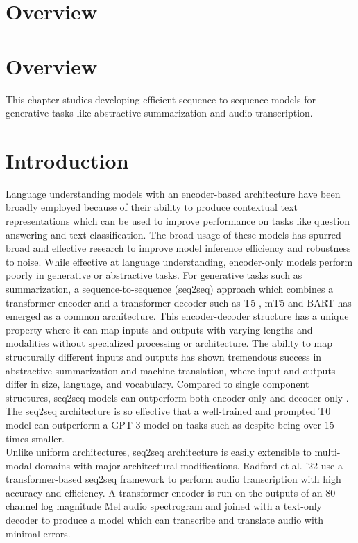 \section{Overview}
\section{Overview}
This chapter studies developing efficient sequence-to-sequence models for generative tasks like abstractive summarization and audio transcription. 
\section{Introduction}
Language understanding models with an encoder-based architecture have been broadly employed because of their ability to produce contextual text representations which can be used to improve performance on tasks like question answering and text classification. The broad usage of these models has spurred broad and effective research to improve model inference efficiency and robustness to noise. While effective at language understanding, encoder-only models perform poorly in generative or abstractive tasks. For generative tasks such as summarization, a sequence-to-sequence (seq2seq) approach which combines a transformer encoder and a transformer decoder such as T5 \cite{Raffel2020ExploringTL}, mT5 \cite{Xue2021mT5AM} and BART \cite{Lewis2020BARTDS} has emerged as a common architecture. This encoder-decoder structure has a unique property where it can map inputs and outputs with varying lengths and modalities without specialized processing or architecture. The ability to map structurally different inputs and outputs has shown tremendous success in abstractive summarization and machine translation, where input and outputs differ in size, language, and vocabulary. Compared to single component structures, seq2seq models can outperform both encoder-only \cite{Zhuang2022RankT5FT} and decoder-only \cite{Sanh2022MultitaskPT}. The seq2seq architecture is so effective that a well-trained and prompted T0 model can outperform a GPT-3 model on tasks such as  \cite{Sanh2022MultitaskPT} despite being over 15 times smaller. \\
Unlike uniform architectures, seq2seq architecture is easily extensible to multi-modal domains with major architectural modifications. Radford et al. '22 \cite{Radford2022RobustSR} use a transformer-based seq2seq framework to perform audio transcription with high accuracy and efficiency. A transformer encoder is run on the outputs of an 80-channel log magnitude Mel audio spectrogram and joined with a text-only decoder to produce a model which can transcribe and translate audio with minimal errors. \\
